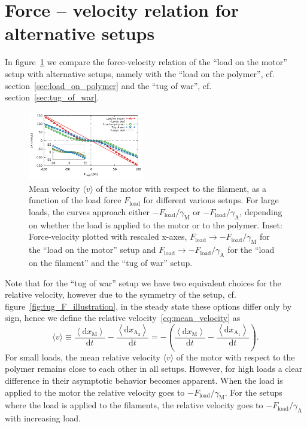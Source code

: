 \documentclass[aps,pre,twocolumn,showpacs,showkeys,superscriptaddress,floatfix]{revtex4-1}
\newcommand{\rmd}{{\mathrm d}}
\begin{document}
\appendix 
\section{Force -- velocity relation for alternative setups}
\label{sec:force_velocity_other}
In figure~\ref{fig:F_v_setups} we compare the force-velocity relation of the ``load on the motor'' setup with alternative setups,
namely with the ``load on the polymer'', cf. section~\ref{sec:load_on_polymer} and the ``tug of war'', cf. section~\ref{sec:tug_of_war}.
\begin{figure}[t]
\centering
\includegraphics[width=0.45\textwidth,height=!]{F_v_setups}
\caption{
\label{fig:F_v_setups} 
Mean velocity $\langle v \rangle$ of the motor with respect to the filament, as a function of the load force $F_\text{load}$ for different various setups.
For large loads, the curves approach either  $ - F_\text{load} / \gamma_\text{M}$ or $ - F_\text{load} / \gamma_\text{A}$, depending on whether the load is applied to the motor or to the polymer. 
Inset: Force-velocity plotted with rescaled x-axes,
$F_\text{load} \to - F_\text{load} / \gamma_\text{M}$ for the ``load on the motor'' setup 
and $F_\text{load} \to - F_\text{load} / \gamma_\text{A}$ for the ``load on the filament'' and the ``tug of war'' setup. 
}
\end{figure}
Note that for the ``tug of war'' setup we have two equivalent choices for the relative velocity,
however due to the symmetry of the setup, cf. figure~\ref{fig:tug_F_illustration}, in the steady state these options differ only by sign, 
hence we define the relative velocity~\eqref{eq:mean_velocity} as 
\[
\langle v \rangle 
\equiv \frac{ \left\langle \rmd x_\text{M} \right\rangle }{ \rmd t }
- \frac{ \left\langle \rmd x_{\text{A}_2} \right\rangle }{ \rmd t }
= - \left( \frac{ \left\langle \rmd x_\text{M} \right\rangle }{ \rmd t }
- \frac{ \left\langle \rmd x_{\text{A}_1} \right\rangle }{ \rmd t } \right) .
\]
For small loads, the mean relative velocity $\langle v \rangle$ of the motor with respect to the polymer remains close to each other in all setups.
However, for high loads a clear difference in their asymptotic behavior becomes apparent.
When the load is applied to the motor the relative velocity goes to $ - F_\text{load} / \gamma_\text{M}$.
For the setups where the load is applied to the filaments, the relative velocity goes to $ - F_\text{load} / \gamma_\text{A}$ with increasing load.
\end{document}
